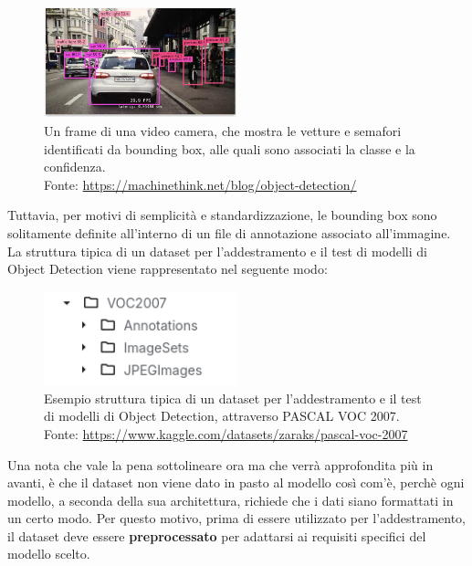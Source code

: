 \begin{figure}[H]
    \centering
    \includegraphics[width=0.5\textwidth]{images/car-bounding-boxes-sample.jpg}
        \caption{Un frame di una video camera, che mostra le vetture e semafori identificati da 
        bounding box, alle quali sono associati la classe e la confidenza.\\
        Fonte: \url{https://machinethink.net/blog/object-detection/}}
    \label{fig:bounding_box}
\end{figure}

Tuttavia, per motivi di semplicità e standardizzazione, le bounding box sono
solitamente definite all'interno di un file di annotazione associato all'immagine.
La struttura tipica di un dataset per l'addestramento e il test di modelli di Object Detection
viene rappresentato nel seguente modo:

\begin{figure}[H]
    \centering
    \includegraphics[width=0.5\textwidth]{images/OD-dataset-sample-pascal-voc-07.png}
        \caption{Esempio struttura tipica di un dataset per l'addestramento e il test di modelli di Object Detection, attraverso PASCAL VOC 2007.\\
        Fonte: \url{https://www.kaggle.com/datasets/zaraks/pascal-voc-2007}}
    \label{fig:dataset_structure}

\end{figure}

Una nota che vale la pena sottolineare ora ma che verrà approfondita più in avanti, è che il dataset non viene dato in pasto al modello
così com'è, perchè ogni modello, a seconda della sua architettura, richiede che i dati
siano formattati in un certo modo. Per questo motivo, prima di essere utilizzato per
l'addestramento, il dataset deve essere \textbf{preprocessato} per adattarsi ai requisiti specifici del modello scelto.


